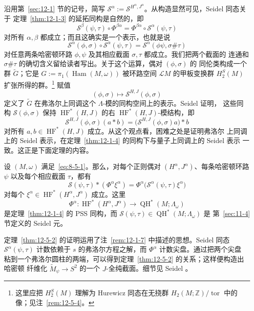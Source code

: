沿用第~\ref{sec:12-1} 节的记号，简写
$\mathcal S^\alpha:=\mathcal S^{H^\alpha,J^\alpha}$。从构造显然可见，Seidel 同态关于
定理~\ref{thm:12-1-3} 的延拓同构是自然的，即
\[
  \mathcal S^\beta(\psi,\tau)\circ\Phi^{\beta\alpha}
  =\Phi^{\beta\alpha}\circ\mathcal S^\alpha(\psi,\tau)
\]
对所有 $\alpha,\beta$ 都成立；而且这确实是一个表示，也就是说
\[
  \mathcal S^\alpha(\phi,\sigma)\circ\mathcal S^\alpha(\psi,\tau)
  =\mathcal S^\alpha(\phi\psi,\sigma\#\tau)
\]
对任意两条哈密顿环路 $\phi,\psi$ 及其相应截面 $\sigma,\tau$ 都成立。我们把两个截面的
连通和 $\sigma\#\tau$ 的确切含义留给读者写出。关于这个运算，偶对 $(\phi,\sigma)$ 的
同伦类构成一个群 $\widetilde G$；它是
$G:=\pi_1(\operatorname{Ham}(M,\omega))$ 被环路空间 $\mathcal L M$ 的甲板变换群
$H_2^S(M)$ 扩张所得的群。\footnote{这里应把 $H_2^S(M)$ 理解为 Hurewicz 同态在无挠群
$H_2(M;\mathbb Z)/\operatorname{tor}$ 中的像；见注~\ref{rem:12-5-4}。}
赋值
\[
  (\phi,\sigma)\longmapsto\mathcal S^{H,J}(\phi,\sigma)
\]
定义了 $\widetilde G$ 在弗洛尔上同调这个 $\Lambda$-模的同构空间上的表示。Seidel 证明，
这些同构 $\mathcal S(\phi,\sigma)$ 保持
$\operatorname{HF}^*(H,J)$ 的右 $\operatorname{HF}^*(H,J)$-模结构，即
\[
  \mathcal S^{H,J}(\phi,\sigma)(a*b)
  =\bigl(\mathcal S^{H,J}(\phi,\sigma)a\bigr)*b
\]
对所有 $a,b\in\operatorname{HF}^*(H,J)$ 成立。从这个观点看，困难之处是证明弗洛尔
上同调上的 Seidel 表示，在定理~\ref{thm:12-1-4} 的同构下与量子上同调上的 Seidel 表示
一致。这正是下面定理的内容。

\begin{theorem}[Seidel]\label{thm:12-5-2}
设 $(M,\omega)$ 满足~\eqref{eq:8-5-1}。那么，对每个正则偶对
$(H^\alpha,J^\alpha)$、每条哈密顿环路 $\psi$ 以及每个相应截面 $\tau$，都有
\[
  \mathcal S(\psi,\tau)*(\Phi^\alpha\xi^\alpha)
  =\Phi^\alpha\bigl(\mathcal S^\alpha(\psi,\tau)\xi^\alpha\bigr)
\]
对每个 $\xi^\alpha\in\operatorname{HF}^*(H^\alpha,J^\alpha)$ 成立。这里
\[
  \Phi^\alpha:
  \operatorname{HF}^*(H^\alpha,J^\alpha)
  \longrightarrow\operatorname{QH}^*(M;\Lambda_\omega)
\]
是定理~\ref{thm:12-1-4} 的 PSS 同构，而
$\mathcal S(\psi,\tau)\in\operatorname{QH}^*(M;\Lambda_\omega)$ 是
第~\ref{sec:11-4} 节定义的 Seidel 元。
\end{theorem}

定理~\ref{thm:12-5-2} 的证明运用了注~\ref{rem:12-1-7} 中描述的思想。Seidel 同态
$\mathcal S^\alpha(\psi,\tau)$
计数依赖于 $s$ 的弗洛尔方程之解，而 $\Phi^\alpha$ 计数尖盘。通过把两个尖盘
粘到一个弗洛尔圆柱的两端，可以得到定理~\ref{thm:12-5-2} 的关系；这样便构造出哈密顿
纤维化 $\widetilde M_\psi\to S^2$ 的一个 $J$-全纯截面。细节见 Seidel 
。


